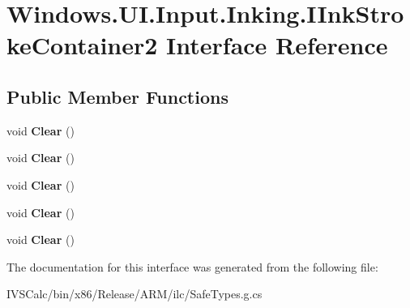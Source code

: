 \hypertarget{interface_windows_1_1_u_i_1_1_input_1_1_inking_1_1_i_ink_stroke_container2}{}\section{Windows.\+U\+I.\+Input.\+Inking.\+I\+Ink\+Stroke\+Container2 Interface Reference}
\label{interface_windows_1_1_u_i_1_1_input_1_1_inking_1_1_i_ink_stroke_container2}
\subsection*{Public Member Functions}
\begin{DoxyCompactItemize}
\item 
\mbox{\label{interface_windows_1_1_u_i_1_1_input_1_1_inking_1_1_i_ink_stroke_container2_a48245b6f05ea05b0bbac98440c84b0b1}} 
void {\bfseries Clear} ()
\item 
\mbox{\label{interface_windows_1_1_u_i_1_1_input_1_1_inking_1_1_i_ink_stroke_container2_a48245b6f05ea05b0bbac98440c84b0b1}} 
void {\bfseries Clear} ()
\item 
\mbox{\label{interface_windows_1_1_u_i_1_1_input_1_1_inking_1_1_i_ink_stroke_container2_a48245b6f05ea05b0bbac98440c84b0b1}} 
void {\bfseries Clear} ()
\item 
\mbox{\label{interface_windows_1_1_u_i_1_1_input_1_1_inking_1_1_i_ink_stroke_container2_a48245b6f05ea05b0bbac98440c84b0b1}} 
void {\bfseries Clear} ()
\item 
\mbox{\label{interface_windows_1_1_u_i_1_1_input_1_1_inking_1_1_i_ink_stroke_container2_a48245b6f05ea05b0bbac98440c84b0b1}} 
void {\bfseries Clear} ()
\end{DoxyCompactItemize}


The documentation for this interface was generated from the following file\+:\begin{DoxyCompactItemize}
\item 
I\+V\+S\+Calc/bin/x86/\+Release/\+A\+R\+M/ilc/Safe\+Types.\+g.\+cs\end{DoxyCompactItemize}
